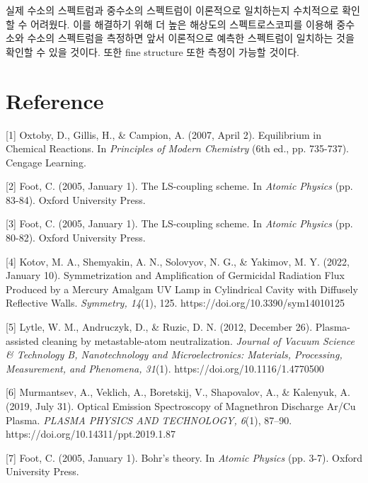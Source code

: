 \documentclass[%
 reprint,
 amsmath,amssymb,
 aps,
]{revtex4-2}
\begin{document}
실제 수소의 스펙트럼과 중수소의 스펙트럼이 이론적으로 일치하는지 수치적으로 확인할 수 어려웠다. 이를 해결하기 위해 더 높은 해상도의 스펙트로스코피를 이용해 중수소와 수소의 스펙트럼을 측정하면 앞서 이론적으로 예측한 스펙트럼이 일치하는 것을 확인할 수 있을 것이다. 또한 fine structure 또한 측정이 가능할 것이다.

\section{\label{sec:level1}Reference}
[1] Oxtoby, D., Gillis, H., \& Campion, A. (2007, April 2). Equilibrium in Chemical Reactions. In \textit{Principles of Modern Chemistry} (6th ed., pp. 735-737). Cengage Learning.

[2] Foot, C. (2005, January 1). The LS-coupling scheme. In \textit{Atomic Physics} (pp. 83-84). Oxford University Press.

[3] Foot, C. (2005, January 1). The LS-coupling scheme. In \textit{Atomic Physics} (pp. 80-82). Oxford University Press.

[4] Kotov, M. A., Shemyakin, A. N., Solovyov, N. G., \& Yakimov, M. Y. (2022, January 10). Symmetrization and Amplification of Germicidal Radiation Flux Produced by a Mercury Amalgam UV Lamp in Cylindrical Cavity with Diffusely Reflective Walls. \textit{Symmetry, 14}(1), 125. https://doi.org/10.3390/sym14010125

[5] Lytle, W. M., Andruczyk, D., \& Ruzic, D. N. (2012, December 26). Plasma-assisted cleaning by metastable-atom neutralization. \textit{Journal of Vacuum Science \& Technology B, Nanotechnology and Microelectronics: Materials, Processing, Measurement, and Phenomena, 31}(1). https://doi.org/10.1116/1.4770500

[6] Murmantsev, A., Veklich, A., Boretskij, V., Shapovalov, A., \& Kalenyuk, A. (2019, July 31). Optical Emission Spectroscopy of Magnethron Discharge Ar/Cu Plasma. \textit{PLASMA PHYSICS AND TECHNOLOGY, 6}(1), 87–90. https://doi.org/10.14311/ppt.2019.1.87

[7] Foot, C. (2005, January 1). Bohr’s theory. In \textit{Atomic Physics} (pp. 3-7). Oxford University Press.
\end{document}
